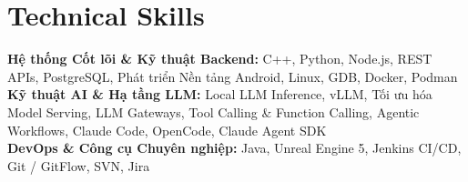 \documentclass[letterpaper,10pt]{article}
\begin{document}
\section{Technical Skills}
 \begin{itemize}[leftmargin=0.15in, label={}]
    \small{\item{
     \textbf{Hệ thống Cốt lõi \& Kỹ thuật Backend:} C++, Python, Node.js, REST APIs, PostgreSQL, Phát triển Nền tảng Android, Linux, GDB, Docker, Podman \\ \textbf{Kỹ thuật AI \& Hạ tầng LLM:} Local LLM Inference, vLLM, Tối ưu hóa Model Serving, LLM Gateways, Tool Calling \& Function Calling, Agentic Workflows, Claude Code, OpenCode, Claude Agent SDK \\ \textbf{DevOps \& Công cụ Chuyên nghiệp:} Java, Unreal Engine 5, Jenkins CI/CD, Git / GitFlow, SVN, Jira
    }}
 \end{itemize}

\end{document}
